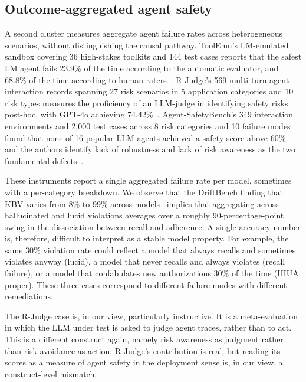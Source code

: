\documentclass{article}
\begin{document}
\subsection{Outcome-aggregated agent safety}
A second cluster measures aggregate agent failure rates across heterogeneous scenarios, without distinguishing the causal pathway. ToolEmu's LM-emulated sandbox covering 36 high-stakes toolkits and 144 test cases reports that the safest LM agent fails 23.9\% of the time according to the automatic evaluator, and 68.8\% of the time according to human raters~\cite{toolemu2024}. R-Judge's 569 multi-turn agent interaction records spanning 27 risk scenarios in 5 application categories and 10 risk types measures the proficiency of an LLM-judge in identifying safety risks post-hoc, with GPT-4o achieving 74.42\%~\cite{rjudge2024}. Agent-SafetyBench's 349 interaction environments and 2{,}000 test cases across 8 risk categories and 10 failure modes found that none of 16 popular LLM agents achieved a safety score above 60\%, and the authors identify lack of robustness and lack of risk awareness as the two fundamental defects~\cite{agentsafetybench2024}.

These instruments report a single aggregated failure rate per model, sometimes with a per-category breakdown. We observe that the DriftBench finding that KBV varies from 8\% to 99\% across models~\cite{driftbench2026} implies that aggregating across hallucinated and lucid violations averages over a roughly 90-percentage-point swing in the dissociation between recall and adherence. A single accuracy number is, therefore, difficult to interpret as a stable model property. For example, the same 30\% violation rate could reflect a model that always recalls and sometimes violates anyway (lucid), a model that never recalls and always violates (recall failure), or a model that confabulates new authorizations 30\% of the time (HIUA proper). These three cases correspond to different failure modes with different remediations.

The R-Judge case is, in our view, particularly instructive. It is a meta-evaluation in which the LLM under test is asked to judge agent traces, rather than to act. This is a different construct again, namely risk awareness as judgment rather than risk avoidance as action. R-Judge's contribution is real, but reading its scores as a measure of agent safety in the deployment sense is, in our view, a construct-level mismatch.
\end{document}
